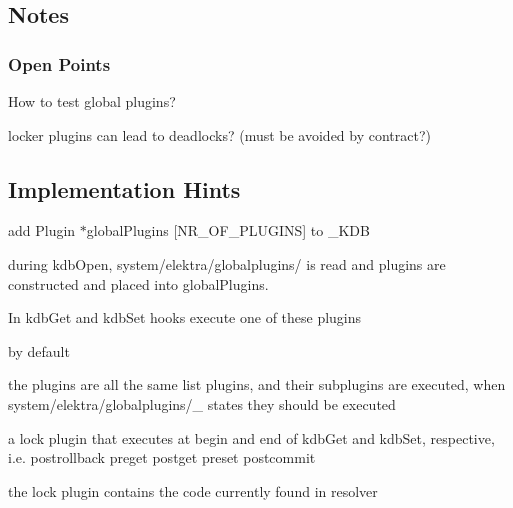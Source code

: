 \subsection*{Notes}

\subsubsection*{Open Points}


\begin{DoxyItemize}
\item How to test global plugins?
\item locker plugins can lead to deadlocks? (must be avoided by contract?)
\end{DoxyItemize}

\subsection*{Implementation Hints}


\begin{DoxyItemize}
\item add {\ttfamily Plugin $\ast$global\+Plugins \mbox{[}N\+R\+\_\+\+O\+F\+\_\+\+P\+L\+U\+G\+I\+N\+S\mbox{]}} to {\ttfamily \+\_\+\+K\+D\+B}
\item during {\ttfamily kdb\+Open}, {\ttfamily system/elektra/globalplugins/} is read and plugins are constructed and placed into {\ttfamily global\+Plugins}.
\item In kdb\+Get and kdb\+Set hooks execute one of these plugins
\item by default
\begin{DoxyItemize}
\item the plugins are all the same {\ttfamily list} plugins, and their subplugins are executed, when {\ttfamily system/elektra/globalplugins/\+\_\+} states they should be executed
\item a {\ttfamily lock} plugin that executes at begin and end of kdb\+Get and kdb\+Set, respective, i.\+e. postrollback preget postget preset postcommit
\item the {\ttfamily lock} plugin contains the code currently found in resolver 
\end{DoxyItemize}
\end{DoxyItemize}
